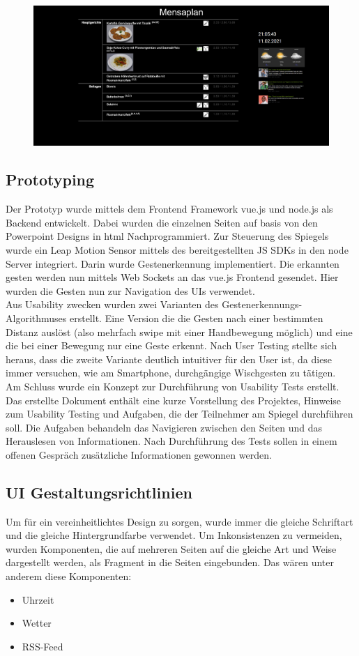 \documentclass[12pt, a4paper]{scrartcl}
\begin{document}
	\begin{figure}[h!]
		\centering
		\includegraphics[width = 0.4\linewidth]{img/mensa.png}
	\end{figure}

	\subsection{Prototyping}
	Der Prototyp wurde mittels dem Frontend Framework vue.js und node.js als Backend entwickelt. Dabei wurden die einzelnen Seiten auf basis von den Powerpoint Designs in html Nachprogrammiert. Zur Steuerung des Spiegels wurde ein Leap Motion Sensor mittels des bereitgestellten JS SDKs in den node Server integriert. Darin wurde Gestenerkennung implementiert. Die erkannten gesten werden nun mittels Web Sockets an das vue.js Frontend gesendet. Hier wurden die Gesten nun zur Navigation des UIs verwendet.\\
	Aus Usability zwecken wurden zwei Varianten des Gestenerkennungs-Algorithmuses erstellt. Eine Version die die Gesten nach einer bestimmten Distanz auslöst (also mehrfach swipe mit einer Handbewegung möglich) und eine die bei einer Bewegung nur eine Geste erkennt. Nach User Testing stellte sich heraus, dass die zweite Variante deutlich intuitiver für den User ist, da diese immer versuchen, wie am Smartphone, durchgängige Wischgesten zu tätigen.\\
	Am Schluss wurde ein Konzept zur Durchführung von Usability Tests erstellt. Das erstellte Dokument enthält eine kurze Vorstellung des Projektes, Hinweise zum Usability Testing und Aufgaben, die der Teilnehmer am Spiegel durchführen soll. Die Aufgaben behandeln das Navigieren zwischen den Seiten und das Herauslesen von Informationen. Nach Durchführung des Tests sollen in einem offenen Gespräch zusätzliche Informationen gewonnen werden.
	
	
	\subsection{UI Gestaltungsrichtlinien}
	Um für ein vereinheitlichtes Design zu sorgen, wurde immer die gleiche Schriftart und die gleiche Hintergrundfarbe verwendet. Um Inkonsistenzen zu vermeiden, wurden Komponenten, die auf mehreren Seiten auf die gleiche Art und Weise dargestellt werden, als Fragment in die Seiten eingebunden. Das wären unter anderem diese Komponenten:
	\begin{itemize}
		\setlength{\itemsep}{-0.5em}
		\item Uhrzeit
		\item Wetter
		\item RSS-Feed
	\end{itemize}
	
\end{document}
